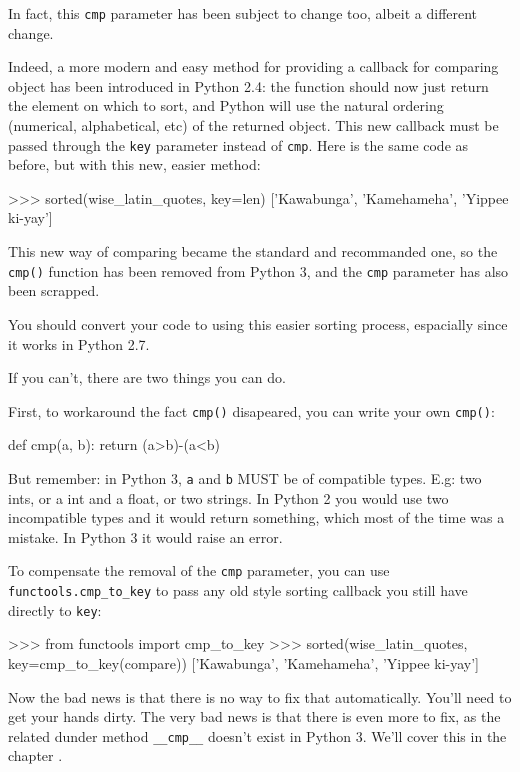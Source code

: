 In fact, this \lstinline{cmp} parameter has been subject to change too, albeit a different change.

Indeed, a more modern and easy method for providing a callback for comparing object has been introduced in Python 2.4: the function should now just return the element on which to sort, and Python will use the natural ordering (numerical, alphabetical, etc) of the returned object. This new callback must be passed through the \lstinline{key} parameter instead of \lstinline{cmp}. Here is the same code as before, but with this new, easier method:

\begin{py2and3}
>>> sorted(wise_latin_quotes, key=len)
['Kawabunga', 'Kamehameha', 'Yippee ki-yay']
\end{py2and3}

This new way of comparing became the standard and recommanded one, so the \lstinline{cmp()} function has been removed from Python 3, and the \lstinline{cmp} parameter has also been scrapped.

You should convert your code to using this easier sorting process, espacially since it works in Python 2.7.

If you can't, there are two things you can do.

First, to workaround the fact \lstinline{cmp()} disapeared, you can write your own \lstinline{cmp()}:

\begin{py2and3}
def cmp(a, b):
    return (a>b)-(a<b)
\end{py2and3}

But remember: in Python 3, \lstinline{a} and \lstinline{b} MUST be of compatible types. E.g: two ints, or a int and a float, or two strings. In Python 2 you would use two incompatible types and it would return something, which most of the time was a mistake. In Python 3 it would raise an error.

To compensate the removal of the \lstinline{cmp} parameter, you can use \lstinline{functools.cmp_to_key} to pass any old style sorting callback you still have directly to \lstinline{key}:

\begin{py2and3}
>>> from functools import cmp_to_key
>>> sorted(wise_latin_quotes, key=cmp_to_key(compare))
['Kawabunga', 'Kamehameha', 'Yippee ki-yay']
\end{py2and3}

Now the bad news is that there is no way to fix that automatically. You'll need to get your hands dirty. The very bad news is that there is even more to fix, as the related \gls{dunder} method \lstinline{__cmp__} doesn't exist in Python 3. We'll cover this in the chapter .

